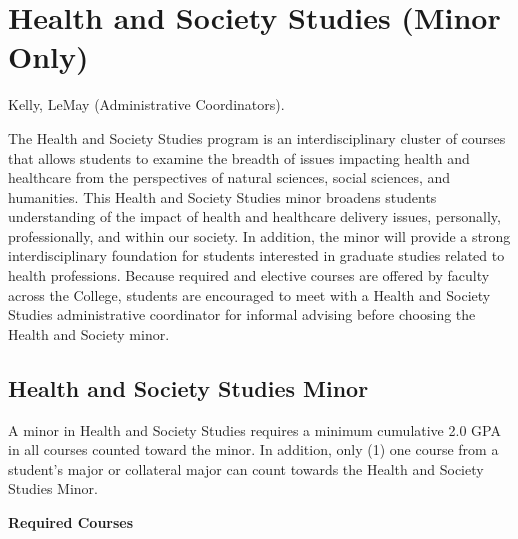 \documentclass[
  letterpaper,
]{scrbook}
\begin{document}
\section{Health and Society Studies (Minor
Only)}\label{sec-health-and-society-studies}

Kelly, LeMay (Administrative Coordinators).

The Health and Society Studies program is an interdisciplinary cluster
of courses that allows students to examine the breadth of issues
impacting health and healthcare from the perspectives of natural
sciences, social sciences, and humanities. This Health and Society
Studies minor broadens students understanding of the impact of health
and healthcare delivery issues, personally, professionally, and within
our society. In addition, the minor will provide a strong
interdisciplinary foundation for students interested in graduate studies
related to health professions. Because required and elective courses are
offered by faculty across the College, students are encouraged to meet
with a Health and Society Studies administrative coordinator for
informal advising before choosing the Health and Society minor.

\subsection{Health and Society Studies
Minor}\label{health-and-society-studies-minor}

A minor in Health and Society Studies requires a minimum cumulative 2.0
GPA in all courses counted toward the minor. In addition, only (1) one
course from a student's major or collateral major can count towards the
Health and Society Studies Minor.

\textbf{Required Courses}
\end{document}
